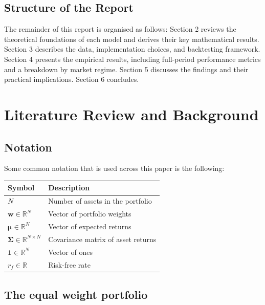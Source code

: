 \documentclass[a4paper,alpha-refs]{scr-contemporary}
\numberwithin{equation}{section}
\begin{document}
\subsection{Structure of the Report}
\indent \indent The remainder of this report is organised as follows: \newline
Section 2 reviews the theoretical foundations of each model 
and derives their key mathematical results. Section 3 
describes the data, implementation choices, and backtesting 
framework. Section 4 presents the empirical results, including 
full-period performance metrics and a breakdown by market 
regime. Section 5 discusses the findings and their practical 
implications. Section 6 concludes.

\section{Literature Review and Background}
\label{sec:theory}
\subsection{Notation}
\indent \indent Some common notation that is used across this paper is the following:

\begin{center}
\begin{tabular}{l l}
\toprule
\textbf{Symbol} & \textbf{Description} \\
\midrule
$N$ & Number of assets in the portfolio \\
$\mathbf{w} \in \mathbb{R}^N$ & Vector of portfolio weights \\
$\boldsymbol{\mu} \in \mathbb{R}^N$ & Vector of expected returns \\
$\boldsymbol{\Sigma} \in \mathbb{R}^{N \times N}$ & Covariance matrix of asset returns \\
$\mathbf{1} \in \mathbb{R}^N$ & Vector of ones \\
$r_f \in \mathbb{R}$ & Risk-free rate \\
\bottomrule
\end{tabular}
\end{center}

\subsection{The equal weight portfolio}
\end{document}
